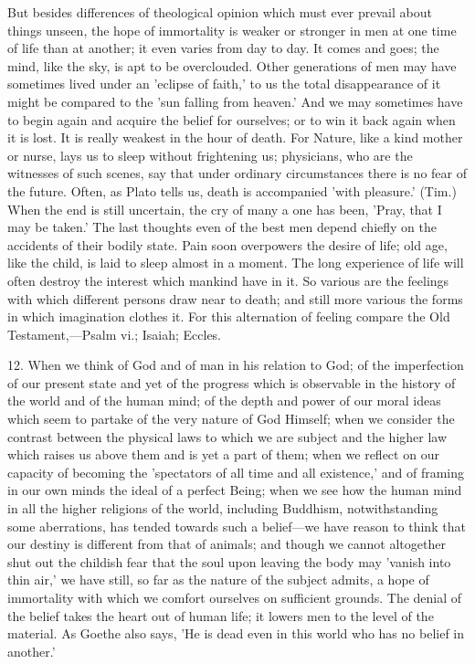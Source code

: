 But besides differences of theological opinion which must ever prevail
about things unseen, the hope of immortality is weaker or stronger in men
at one time of life than at another; it even varies from day to day. It
comes and goes; the mind, like the sky, is apt to be overclouded. Other
generations of men may have sometimes lived under an 'eclipse of faith,'
to us the total disappearance of it might be compared to the 'sun falling
from heaven.' And we may sometimes have to begin again and acquire the
belief for ourselves; or to win it back again when it is lost. It is
really weakest in the hour of death. For Nature, like a kind mother or
nurse, lays us to sleep without frightening us; physicians, who are the
witnesses of such scenes, say that under ordinary circumstances there is
no fear of the future. Often, as Plato tells us, death is accompanied
'with pleasure.' (Tim.) When the end is still uncertain, the cry of many a
one has been, 'Pray, that I may be taken.' The last thoughts even of the
best men depend chiefly on the accidents of their bodily state. Pain soon
overpowers the desire of life; old age, like the child, is laid to sleep
almost in a moment. The long experience of life will often destroy the
interest which mankind have in it. So various are the feelings with which
different persons draw near to death; and still more various the forms in
which imagination clothes it. For this alternation of feeling compare the
Old Testament,—Psalm vi.; Isaiah; Eccles.

12. When we think of God and of man in his relation to God; of the
imperfection of our present state and yet of the progress which is
observable in the history of the world and of the human mind; of the depth
and power of our moral ideas which seem to partake of the very nature of
God Himself; when we consider the contrast between the physical laws to
which we are subject and the higher law which raises us above them and is
yet a part of them; when we reflect on our capacity of becoming the
'spectators of all time and all existence,' and of framing in our own
minds the ideal of a perfect Being; when we see how the human mind in all
the higher religions of the world, including Buddhism, notwithstanding
some aberrations, has tended towards such a belief—we have reason to
think that our destiny is different from that of animals; and though we
cannot altogether shut out the childish fear that the soul upon leaving
the body may 'vanish into thin air,' we have still, so far as the nature
of the subject admits, a hope of immortality with which we comfort
ourselves on sufficient grounds. The denial of the belief takes the heart
out of human life; it lowers men to the level of the material. As Goethe
also says, 'He is dead even in this world who has no belief in another.'

